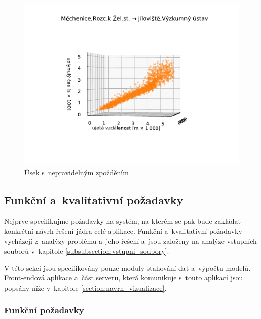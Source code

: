 \begin{figure}
\centering
  \includegraphics[width=\linewidth]{../img/1128_1129}
  \caption{Úsek s~nepravidelným zpožděním}
  \label{fig:nepredvidatelne_zdrzeni}
\end{figure}



\subsection{Funkční a~kvalitativní požadavky}


Nejprve specifikujme požadavky na systém, na kterém se pak bude zakládat
konkrétní návrh řešení jádra celé aplikace. Funkční a~kvalitativní požadavky vycházejí z~analýzy problému a~jeho řešení a~jsou založeny na analýze vstupních souborů v~kapitole \ref{subsubsection:vstupni_soubory}.

\bigbreak

V této sekci jsou specifikovány pouze moduly stahování dat a~výpočtu modelů. Front-endová aplikace a~část serveru, která komunikuje s~touto aplikací jsou popsány níže v~kapitole \ref{section:navrh_vizualizace}.


\subsubsection{Funkční požadavky}


